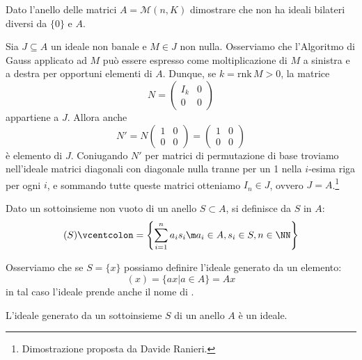 \documentclass[11pt]{scrartcl}
\begin{document}
\begin{exercise}
    Dato l'anello delle matrici $A = \mathcal{M}(n,K)$ dimostrare che non ha ideali bilateri diversi da $\{0\}$ e $A$.
\end{exercise}

\begin{soln}
Sia $J\subseteq A$ un ideale non banale e $M\in J$ non nulla. Osserviamo che l'Algoritmo di Gauss applicato ad $M$ può essere espresso come moltiplicazione di $M$
a sinistra e a destra per opportuni elementi di $A$. Dunque, se $k=\mathrm{rnk}\, M>0$, la matrice 
\[ N=\left(\begin{array}{c|c}
    I_k & 0\\
    \hline
    0 & 0
\end{array}\right)
    \]
appartiene a $J$. Allora anche
\[
    N'=N\left(\begin{array}{c|c}
        1 & 0 \\
        \hline
        0 & 0
    \end{array}\right)
=\left(\begin{array}{c|c}
    1 & 0 \\
    \hline
    0 & 0
\end{array}\right)\]
è elemento di $J$. Coniugando $N'$ per matrici di permutazione di base troviamo nell'ideale matrici diagonali con diagonale nulla tranne per un 1
nella $i$-esima riga per ogni $i$, e sommando tutte queste matrici otteniamo $I_n\in J$, ovvero $J=A$.\footnote{Dimostrazione proposta da Davide Ranieri.}
\end{soln}

\begin{definition}
    Dato un sottoinsieme non vuoto di un anello $S \subset A$, si definisce  da $S$ in $A$:
        \[ (S) \vcentcolon =  \left\{\sum_{i = 1}^{n}a_is_i \m a_i \in A, s_i \in S, n \in \NN\right\}
            \]
\end{definition}

Osserviamo che se $S = \{x\}$ possiamo definire l'ideale generato da un elemento:
        \[ (x) = \{ax | a \in A\} = Ax
            \]
in tal caso l'ideale prende anche il nome di .
        
\begin{proposition}
    L'ideale generato da un sottoinsieme $S$ di un anello $A$ è un ideale.
\end{proposition}
\end{document}
